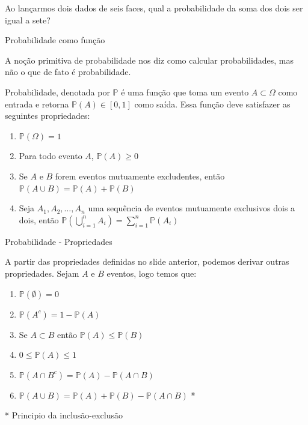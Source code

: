\begin{frame}
    \begin{exemplo}
        Ao lançarmos dois dados de seis faces, qual a probabilidade da soma dos dois ser igual a sete?
        \end{exemplo}
\end{frame}

\begin{frame}{Probabilidade como função}

A noção primitiva de probabilidade nos diz como calcular probabilidades, mas não o que de fato é probabilidade. 

\begin{definicao}
    Probabilidade, denotada por $\mathds{P}$ é uma função que toma um evento $A \subset \Omega$ como entrada e retorna $\mathds{P}(A) \in [0,1]$ como saída. Essa função deve satisfazer as seguintes propriedades:

    \begin{enumerate}
        \item $\mathds{P}(\Omega) = 1$
        \item Para todo evento $A$, $\mathds{P}(A) \geq 0$
        \item Se $A$ e $B$ forem eventos mutuamente excludentes, então $\mathds{P}(A \cup B) = \mathds{P}(A) + \mathds{P}(B)$
        \item Seja $A_1, A_2, \dots, A_n$ uma sequência de eventos mutuamente exclusivos dois a dois, então $\mathds{P}(\bigcup_{i=1}^n A_i) = \sum_{i=1}^{n} \mathds{P}(A_i)$
    \end{enumerate}

\end{definicao}
    
\end{frame}

\begin{frame}{Probabilidade - Propriedades}

A partir das propriedades definidas no slide anterior, podemos derivar outras propriedades. Sejam $A$ e $B$  eventos, logo temos que:
\begin{enumerate}
    \item $\mathds{P}(\emptyset) = 0$
    \pause
    \item $\mathds{P}(A^c) = 1 - \mathds{P}(A)$
    \pause
    \item Se $A \subset B$ então $\mathds{P}(A) \leq \mathds{P}(B)$
    \pause
    \item $0 \leq \mathds{P}(A) \leq 1$
    \pause
    \item $\mathds{P}(A \cap B^c) = \mathds{P}(A) - \mathds{P}(A \cap B)$
    \pause
    \item $\mathds{P}(A \cup B) = \mathds{P}(A) + \mathds{P}(B) - \mathds{P}(A \cap B)$ *
\end{enumerate}
    * Principio da inclusão-exclusão
\end{frame}


